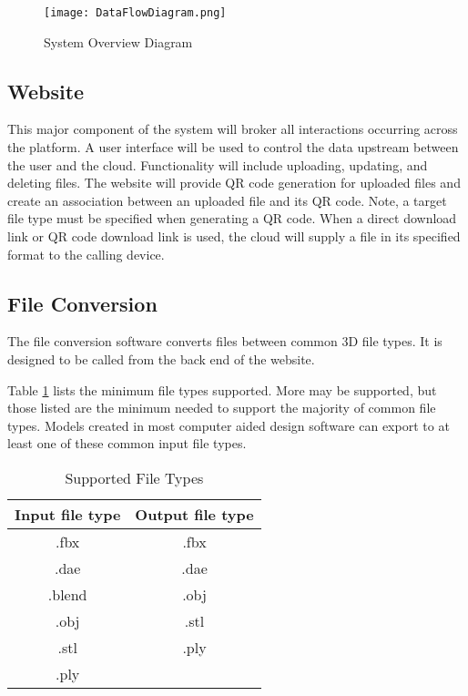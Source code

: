 \begin{figure}[H]
	\centering
	\texttt{[image: DataFlowDiagram.png]}
	\caption{System Overview Diagram} 
	\label{fig:UMLSystemOverview}	
\end{figure}

\subsection{Website}
This major component of the system will broker all interactions occurring across the platform. A user interface will be used to control the data upstream between the user and the cloud. Functionality will include uploading, updating, and deleting files. The website will provide QR code generation for uploaded files and create an association between an uploaded file and its QR code. Note, a target file type must be specified when generating a QR code. When a direct download link or QR code download link is used, the cloud will supply a file in its specified format to the calling device. 


\subsection{File Conversion}
The file conversion software converts files between common 3D file types. It is designed to be called from the back end of the website.

Table \ref{tab:suportedfiletypes} lists the minimum file types supported.  More may be supported, but those listed are the minimum needed to support the majority of common file types.  
Models created in most computer aided design software can export to at least one of these common input file types.

\begin{table}[!h]
    \centering
    \begin{tabular}{| c | c |}
        \hline
        Input file type & Output file type \\
        \hline
        .fbx & .fbx \\
        .dae & .dae \\
        .blend & .obj \\ 
        .obj & .stl \\
        .stl & .ply \\
        .ply & \\
        \hline
    \end{tabular}
    \caption{Supported File Types}
    \label{tab:suportedfiletypes}
\end{table}

